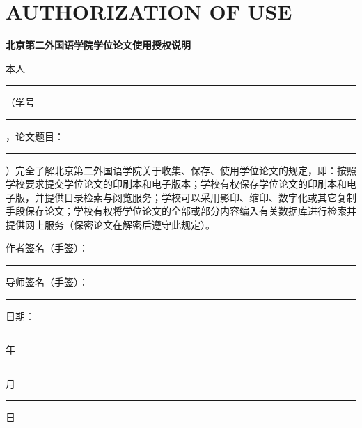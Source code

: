 
\chapter*{AUTHORIZATION OF USE}

\begin{center}
\textbf{北京第二外国语学院学位论文使用授权说明}
\end{center}

\noindent
本人 \rule{3cm}{0.4pt}（学号 \rule{3cm}{0.4pt}，论文题目：\rule{5cm}{0.4pt}）完全了解北京第二外国语学院关于收集、保存、使用学位论文的规定，即：按照学校要求提交学位论文的印刷本和电子版本；学校有权保存学位论文的印刷本和电子版，并提供目录检索与阅览服务；学校可以采用影印、缩印、数字化或其它复制手段保存论文；学校有权将学位论文的全部或部分内容编入有关数据库进行检索并提供网上服务（保密论文在解密后遵守此规定）。

\vspace{2cm}

\noindent
\begin{minipage}[t]{0.45\textwidth}
作者签名（手签）：\rule{3cm}{0.4pt}
\end{minipage}
\hfill
\begin{minipage}[t]{0.45\textwidth}
导师签名（手签）：\rule{3cm}{0.4pt}
\end{minipage}

\vspace{0.5cm}

\hfill 日期：\rule{1.5cm}{0.4pt} 年 \rule{1cm}{0.4pt} 月 \rule{1cm}{0.4pt} 日
